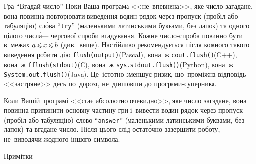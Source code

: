\begin{problemAllDefault}{Гра ``Вгадай число''}
\OutputFile
Поки Ваша програма <<не~впевнена>>, яке число загадане,  
вона повинна повторювати виведення 
в\nolinebreak[2] один рядок через пропуск (пробіл або табуляцію) 
сл\'{о}ва ``\texttt{try}'' (маленькими латинськими буквами, без лапок)
та одного цілого числ\'{а}\nolinebreak[3] --- 
чергової спроби вгадування\nolinebreak[3].
Кожне число-спроба повинно бути в~межах $a\dib{{\<}}x\dib{{\<}}b$ (див.~вище).
Настійливо рекомендується після кожного такого виведення 
робити дію \verb"flush(output)"\nolinebreak[2] (Pascal), 
вона~ж \verb"cout.flush()"\nolinebreak[2] (C++), 
вона~ж \verb"fflush(stdout)"\nolinebreak[2] (C), 
вона~ж \verb"sys.stdout.flush()"\nolinebreak[2] (Python),
вона~ж \verb"System.out.flush()"\nolinebreak[2] (Java).
Це~істотно зменшує ризик, 
що~проміжна відповідь <<застряне>> десь по~дорозі, 
не~дійшовши до програми-суперника.

Коли Вашій програмі <<стає абсолютно очевидно>>, яке число загадане,
вона повинна припинити основну частину гри і~вивести 
в\nolinebreak[2] один рядок через пропуск (пробіл або табуляцію) 
слово ``\texttt{answer}'' (маленькими латинськими буквами, без лапок)
та вгадане число. Після цього слід остат\'{о}чно завершити роботу, 
не~виводячи жодного іншого символа.

\Example

\noindent\begin{exampleSimpleThree}{5em}{5em}{6cm}{Примітки}
%
\end{exampleSimpleThree}

\end{problemAllDefault}
